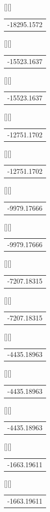 \begin{psfrags}
[][]{\color[rgb]{0,0,0}\setlength{\tabcolsep}{0pt}\begin{tabular}{c}-18295.1572\end{tabular}}%
[][]{\color[rgb]{0,0,0}\setlength{\tabcolsep}{0pt}\begin{tabular}{c}-15523.1637\end{tabular}}%
[][]{\color[rgb]{0,0,0}\setlength{\tabcolsep}{0pt}\begin{tabular}{c}-15523.1637\end{tabular}}%
[][]{\color[rgb]{0,0,0}\setlength{\tabcolsep}{0pt}\begin{tabular}{c}-12751.1702\end{tabular}}%
[][]{\color[rgb]{0,0,0}\setlength{\tabcolsep}{0pt}\begin{tabular}{c}-12751.1702\end{tabular}}%
[][]{\color[rgb]{0,0,0}\setlength{\tabcolsep}{0pt}\begin{tabular}{c}-9979.17666\end{tabular}}%
[][]{\color[rgb]{0,0,0}\setlength{\tabcolsep}{0pt}\begin{tabular}{c}-9979.17666\end{tabular}}%
[][]{\color[rgb]{0,0,0}\setlength{\tabcolsep}{0pt}\begin{tabular}{c}-7207.18315\end{tabular}}%
[][]{\color[rgb]{0,0,0}\setlength{\tabcolsep}{0pt}\begin{tabular}{c}-7207.18315\end{tabular}}%
[][]{\color[rgb]{0,0,0}\setlength{\tabcolsep}{0pt}\begin{tabular}{c}-4435.18963\end{tabular}}%
[][]{\color[rgb]{0,0,0}\setlength{\tabcolsep}{0pt}\begin{tabular}{c}-4435.18963\end{tabular}}%
[][]{\color[rgb]{0,0,0}\setlength{\tabcolsep}{0pt}\begin{tabular}{c}-4435.18963\end{tabular}}%
[][]{\color[rgb]{0,0,0}\setlength{\tabcolsep}{0pt}\begin{tabular}{c}-1663.19611\end{tabular}}%
[][]{\color[rgb]{0,0,0}\setlength{\tabcolsep}{0pt}\begin{tabular}{c}-1663.19611\end{tabular}}%

\end{psfrags}
